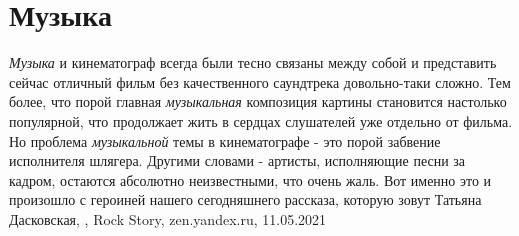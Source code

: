  
 
 
 
 
\chapter{Музыка}

\emph{Музыка} и кинематограф всегда были тесно связаны между собой и представить
сейчас отличный фильм без качественного саундтрека довольно-таки сложно. Тем
более, что порой главная \emph{музыкальная} композиция картины становится настолько
популярной, что продолжает жить в сердцах слушателей уже отдельно от фильма.
Но проблема \emph{музыкальной} темы в кинематографе - это порой забвение исполнителя
шлягера. Другими словами - артисты, исполняющие песни за кадром, остаются
абсолютно неизвестными, что очень жаль. Вот именно это и произошло с героиней
нашего сегодняшнего рассказа, которую зовут Татьяна Дасковская,
, Rock Story,
zen.yandex.ru, 11.05.2021

